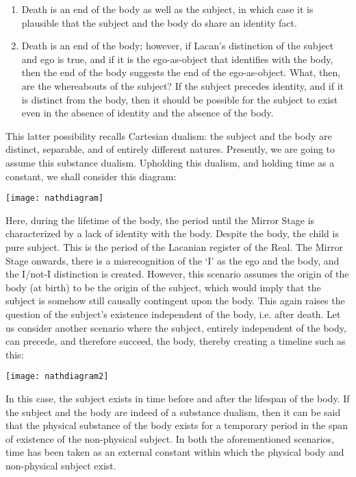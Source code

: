 \begin{enumerate}
	\item Death is an end of the body as well as the subject, in which case it
is plausible that the subject and the body do share an identity fact.

	\item Death is an end of the body; however, if Lacan's distinction of the
subject and ego is true, and if it is the ego-as-object that identifies
with the body, then the end of the body suggests the end of the
ego-as-object. What, then, are the whereabouts of the subject? If the
subject precedes identity, and if it is distinct from the body, then it
should be possible for the subject to exist even in the absence of
identity and the absence of the body.
\end{enumerate}

This latter possibility recalls Cartesian dualism: the subject and the
body are distinct, separable, and of entirely different natures.
Presently, we are going to assume this substance dualism. Upholding this
dualism, and holding time as a constant, we shall consider this diagram:
\begin{center}
\texttt{[image: nathdiagram]}
\end{center}
Here,
during the lifetime of the body, the period until the Mirror Stage is
characterized by a lack of identity with the body. Despite the body, the child is pure subject.
This is the period of the Lacanian register of the Real. The Mirror
Stage onwards, there is a misrecognition of the `I' as the ego and the
body, and the I/not-I distinction is created. However, this scenario
assumes the origin of the body (at birth) to be the origin of the
subject, which would imply that the subject is somehow still causally
contingent upon the body. This again raises the question of the
subject's existence independent of the body, i.e. after death. Let us
consider another scenario where the subject, entirely independent of the
body, can precede, and therefore succeed, the body, thereby creating a
timeline such as this:
\begin{center}
\texttt{[image: nathdiagram2]}
\end{center}
In this case, the subject exists in time before and after the lifespan
of the body. If the subject and the body are indeed of a substance
dualism, then it can be said that the physical substance of the body
exists for a temporary period in the span of existence of the
non-physical subject. In both the aforementioned scenarios, time has been taken as an external
constant within which the physical body and non-physical subject exist.

